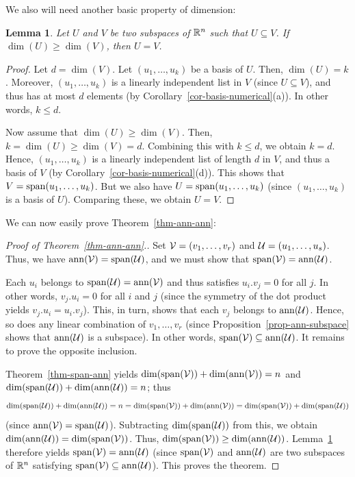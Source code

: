 \documentclass[reqno]{amsart}
\newtheorem{lemma}[theorem]{Lemma}
\theoremstyle{definition}
\begin{document}
We also will need another basic property of dimension:

\begin{lemma}\label{dim-subdim}
Let $U$ and $V$ be two subspaces of ${\mathbb{R}}^n$ such that $U \subseteq V$.
If $\dim(U) \geq \dim(V)$, then $U = V$.
\end{lemma}

\begin{proof}
Let $d = \dim(V)$.
Let $(u_1, \ldots, u_k)$ be a basis of $U$.
Then, $\dim(U) = k$.
Moreover, $(u_1, \ldots, u_k)$ is a linearly independent
list in $V$ (since $U \subseteq V$), and thus has
at most $d$ elements (by Corollary~\ref{cor-basis-numerical}(a)).
In other words, $k \leq d$.

Now assume that $\dim(U) \geq \dim(V)$.
Then, $k = \dim(U) \geq \dim(V) = d$.
Combining this with $k \leq d$, we obtain $k = d$.
Hence, $(u_1, \ldots, u_k)$ is a linearly independent
list of length $d$ in $V$, and thus a basis of $V$
(by Corollary~\ref{cor-basis-numerical}(d)).
This shows that $V = \operatorname{span}(u_1, \ldots, u_k)$.
But we also have $U = \operatorname{span}(u_1, \ldots, u_k)$
(since $(u_1, \ldots, u_k)$ is a basis of $U$).
Comparing these, we obtain $U = V$.
\end{proof}

We can now easily prove Theorem~\ref{thm-ann-ann}:

\begin{proof}[Proof of Theorem~\ref{thm-ann-ann}.]
Set $\mathcal{V} = (v_1, \ldots, v_r)$ and $\mathcal{U} = (u_1, \ldots, u_s)$.
Thus, we have $\operatorname{ann}(\mathcal{V}) = \operatorname{span}(\mathcal{U})$, and we must show that
$\operatorname{span}(\mathcal{V}) = \operatorname{ann}(\mathcal{U})$.

Each $u_i$ belongs to $\operatorname{span}(\mathcal{U}) = \operatorname{ann}(\mathcal{V})$ and thus
satisfies $u_i.v_j = 0$ for all $j$.
In other words, $v_j.u_i = 0$ for all $i$ and $j$ (since
the symmetry of the dot product yields $v_j.u_i = u_i.v_j$).
This, in turn, shows that each $v_j$ belongs to $\operatorname{ann}(\mathcal{U})$.
Hence, so does any linear combination of $v_1, \ldots, v_r$
(since Proposition~\ref{prop-ann-subspace} shows that
$\operatorname{ann}(\mathcal{U})$ is a subspace).
In other words, $\operatorname{span}(\mathcal{V}) \subseteq \operatorname{ann}(\mathcal{U})$.
It remains to prove the opposite inclusion.

Theorem~\ref{thm-span-ann} yields
$\dim(\operatorname{span}(\mathcal{V})) + \dim(\operatorname{ann}(\mathcal{V})) = n$
and
$\dim(\operatorname{span}(\mathcal{U})) + \dim(\operatorname{ann}(\mathcal{U})) = n$;
thus
\[
\dim(\operatorname{span}(\mathcal{U})) + \dim(\operatorname{ann}(\mathcal{U}))
= n = \dim(\operatorname{span}(\mathcal{V})) + \dim(\operatorname{ann}(\mathcal{V}))
= \dim(\operatorname{span}(\mathcal{V})) + \dim(\operatorname{span}(\mathcal{U}))
\]
(since $\operatorname{ann}(\mathcal{V}) = \operatorname{span}(\mathcal{U})$).
Subtracting $\dim(\operatorname{span}(\mathcal{U}))$ from this, we obtain
$\dim(\operatorname{ann}(\mathcal{U})) = \dim(\operatorname{span}(\mathcal{V}))$.
Thus, $\dim(\operatorname{span}(\mathcal{V})) \geq \dim(\operatorname{ann}(\mathcal{U}))$.
Lemma~\ref{dim-subdim} therefore yields
$\operatorname{span}(\mathcal{V}) = \operatorname{ann}(\mathcal{U})$ (since $\operatorname{span}(\mathcal{V})$ and $\operatorname{ann}(\mathcal{U})$
are two subspaces of ${\mathbb{R}}^n$ satisfying
$\operatorname{span}(\mathcal{V}) \subseteq \operatorname{ann}(\mathcal{U})$).
This proves the theorem.
\end{proof}
\end{document}
